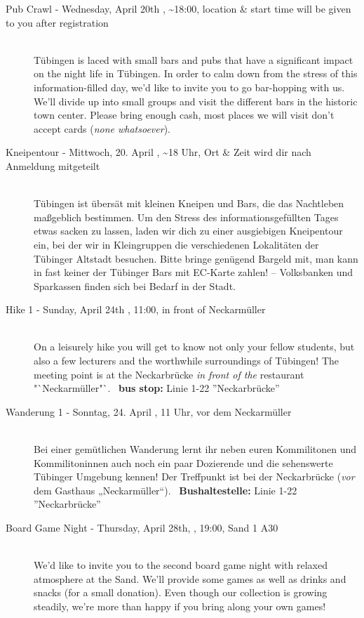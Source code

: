 \begin{description}
\ifml
	\item[Pub Crawl - Wednesday, April 20th \YEAR, \textasciitilde 18:00, \footnotesize{location \& start time will be given to you after registration}]~\\
Tübingen is laced with small bars and pubs that have a significant impact on the night life in Tübingen.
In order to calm down from the stress of this information-filled day, we'd like to invite you to go bar-hopping with us.
We'll divide up into small groups and visit the different bars in the historic town center.
Please bring enough cash, most places we will visit don't accept cards (\emph{none whatsoever}).

\else
	\item[Kneipentour - Mittwoch, 20. April \YEAR, \textasciitilde 18 Uhr, \footnotesize{Ort \& Zeit wird dir nach Anmeldung mitgeteilt}]~\\
Tübingen ist übersät mit kleinen Kneipen und Bars, die das Nachtleben maßgeblich bestimmen.
Um den Stress des informationsgefüllten Tages etwas sacken zu lassen, laden wir dich zu einer ausgiebigen Kneipentour ein,
bei der wir in Kleingruppen die verschiedenen Lokalitäten der Tübinger Altstadt besuchen.
Bitte bringe genügend Bargeld mit, man kann in fast keiner der Tübinger Bars mit EC-Karte zahlen! -- Volksbanken und Sparkassen
finden sich bei Bedarf in der Stadt.
\fi

\ifml
    \item[Hike 1 - Sunday, April 24th \YEAR, 11:00, in front of Neckarmüller]~\\
        On a leisurely hike you will get to know not only your fellow students,
        but also a few lecturers and the worthwhile surroundings of Tübingen!
        The meeting point is at the Neckarbrücke \emph{in front of the} restaurant "`Neckarmüller"`.
        ~\textbf{bus stop:} Linie 1-22 ''Neckarbrücke''
\else
    \item[Wanderung 1 - Sonntag, 24. April \YEAR, 11 Uhr, vor dem Neckarmüller]~\\
        Bei einer gemütlichen Wanderung lernt ihr neben euren Kommilitonen und Kommilitoninnen auch
        noch ein paar Dozierende und die sehenswerte Tübinger Umgebung kennen!
        Der Treffpunkt ist bei der Neckarbrücke (\emph{vor} dem Gasthaus „Neckarmüller“).
	    ~\textbf{Bushaltestelle:} Linie 1-22 ''Neckarbrücke''
\fi

\ifml
\item[Board Game Night - Thursday, April 28th, \YEAR, 19:00, Sand 1 A30]\ \\
We'd like to invite you to the second board game night with relaxed atmosphere at the Sand.
We'll provide some games as well as drinks and snacks (for a small donation).
Even though our collection is growing steadily, we're more than happy if you bring along your own games!


\end{description}
